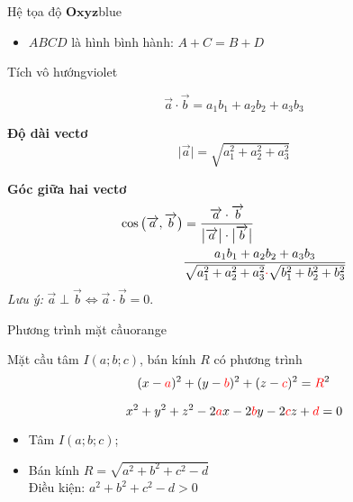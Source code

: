 \documentclass[12pt,a4paper,landscape]{book}
\begin{document}
\begin{multicols*}{3}
\begin{khung_trello}{Hệ tọa độ $\mathbf{Oxyz}$}{blue}
\begin{khung_trello_box}
\begin{itemize}[leftmargin=5mm,label={\color{trello_bg_blue}$\heartsuit$}]
					\item $ABCD$ là hình bình hành: $A+C=B+D$
				\end{itemize}
			\end{khung_trello_box}
		\end{khung_trello}
		\begin{khung_trello}{Tích vô hướng}{violet}
			\begin{khung_trello_box}
				$$\overrightarrow{a}\cdot\overrightarrow{b}=a_1b_1+a_2b_2+a_3b_3$$
			\end{khung_trello_box}
			\begin{khung_trello_box}
				\textbf{\color{trello_bg_violet}Độ dài vectơ}
				$$\big|\overrightarrow{a}\big|=\sqrt{a_1^2+a_2^2+a_3^2}$$
			\end{khung_trello_box}
			\begin{khung_trello_box}
				\textbf{\color{trello_bg_violet}Góc giữa hai vectơ}
				$$\begin{aligned}
					\cos\big(\overrightarrow{a},\overrightarrow{b}\big)&=\dfrac{\overrightarrow{a}\cdot\overrightarrow{b}}{\big|\overrightarrow{a}\big|\cdot\big|\overrightarrow{b}\big|}\\
					&\dfrac{a_1b_1+a_2b_2+a_3b_3}{\sqrt{a_1^2+a_2^2+a_3^2}{\color{red}\cdot}\sqrt{b_1^2+b_2^2+b_3^2}}
				\end{aligned}$$
				\textit{Lưu ý:} $\overrightarrow{a}\perp\overrightarrow{b}\Leftrightarrow\overrightarrow{a}\cdot\overrightarrow{b}=0$.
			\end{khung_trello_box}
		\end{khung_trello}
		\begin{khung_trello}{Phương trình mặt cầu}{orange}
			\begin{khung_trello_box}
				Mặt cầu tâm $I(a;b;c)$, bán kính $R$ có phương trình
				$$(x-{\color{red}a})^2+(y-{\color{red}b})^2+(z-{\color{red}c})^2={\color{red}R}^2$$
			\end{khung_trello_box}
			\begin{khung_trello_box}
				$$x^2+y^2+z^2-2{\color{red}a}x-2{\color{red}b}y-2{\color{red}c}z+{\color{red}d}=0$$
				\begin{itemize}[leftmargin=5mm]
					\item Tâm $I(a;b;c)$;
					\item Bán kính $R=\sqrt{a^2+b^2+c^2-d}$\\
						  Điều kiện: $a^2+b^2+c^2-d>0$
				\end{itemize}
			\end{khung_trello_box}
		\end{khung_trello}

\end{multicols*}
\end{document}
